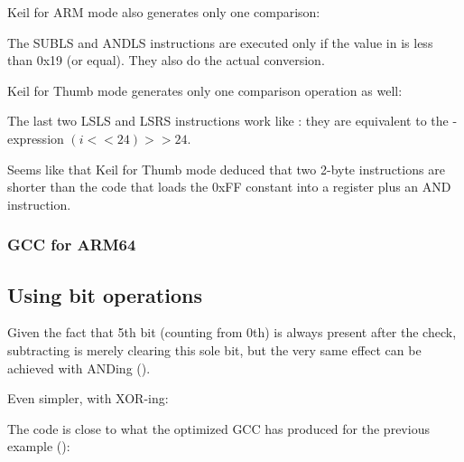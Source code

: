 \Optimizing Keil for ARM mode also generates only one comparison:



The SUBLS and ANDLS instructions are executed only if the value in  is less than 0x19 (or equal).
They also do the actual conversion.

\Optimizing Keil for Thumb mode generates only one comparison operation as well:



The last two LSLS and LSRS instructions work like :
they are equivalent to the \CCpp-expression $(i<<24)>>24$.

Seems like that Keil for Thumb mode deduced that two 2-byte instructions are shorter than the code 
that loads the 0xFF constant into a register plus an AND instruction.

\subsubsection{GCC for ARM64}





\subsection{Using bit operations}
\label{toupper_bit}

Given the fact that 5th bit (counting from 0th) is always present after the check, subtracting is merely clearing
this sole bit, but the very same effect can be achieved with ANDing ().

Even simpler, with XOR-ing:



The code is close to what the optimized GCC has produced for the previous example ():



